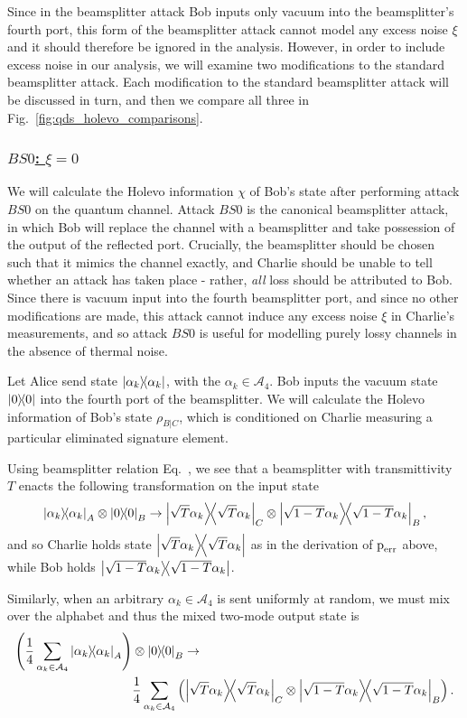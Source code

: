 Since in the beamsplitter attack Bob inputs only vacuum into the beamsplitter's fourth port, this form of the beamsplitter attack cannot model any excess noise $\xi$ and it should therefore be ignored in the analysis. However, in order to include excess noise in our analysis, we will examine two modifications to the standard beamsplitter attack. Each modification to the standard beamsplitter attack will be discussed in turn, and then we compare all three in Fig.~\ref{fig:qds_holevo_comparisons}. 

\subsubsection{\underline{$BS0$: $\xi = 0$}}
We will calculate the Holevo information $\chi$ of Bob's state after performing attack $BS0$ on the quantum channel. Attack $BS0$ is the canonical beamsplitter attack, in which Bob will replace the channel with a beamsplitter and take possession of the output of the reflected port. Crucially, the beamsplitter should be chosen such that it mimics the channel exactly, and Charlie should be unable to tell whether an attack has taken place - rather, \emph{all} loss should be attributed to Bob. Since there is vacuum input into the fourth beamsplitter port, and since no other modifications are made, this attack cannot induce any excess noise $\xi$ in Charlie's measurements, and so attack $BS0$ is useful for modelling purely lossy channels in the absence of thermal noise.

Let Alice send state $\dyad{\alpha_k}$, with the $\alpha_k \in \mathcal{A}_4$. Bob inputs the vacuum state $\dyad{0}$ into the fourth port of the beamsplitter. We will calculate the Holevo information of Bob's state $\rho_{B | C}$, which is conditioned on Charlie measuring a particular eliminated signature element.

Using beamsplitter relation Eq.~, we see that a beamsplitter with transmittivity $T$ enacts the following transformation on the input state
\begin{equation}
\dyad{\alpha_k}_A \otimes \dyad{0}_B \rightarrow \dyad{\sqrt{T} \alpha_k}_C \otimes \dyad{\sqrt{1-T}\alpha_k}_{B},
\end{equation}
and so Charlie holds state $\dyad{\sqrt{T}\alpha_k}$ as in the derivation of $\text{p}_{\text{err}}$ above, while Bob holds $\dyad{\sqrt{1-T}\alpha_k}$.

Similarly, when an arbitrary $\alpha_k \in \mathcal{A}_4$ is sent uniformly at random, we must mix over the alphabet and thus the mixed two-mode output state is
\begin{align}
\left(\frac{1}{4}\sum_{\alpha_k \in \mathcal{A}_4} \dyad{\alpha_k}_A\right) &\otimes \dyad{0}_B \rightarrow \notag \\
&\frac{1}{4}\sum_{\alpha_k \in \mathcal{A}_4} \left(\dyad{\sqrt{T}\alpha_k}_C \otimes \dyad{\sqrt{1-T}\alpha_k}_B\right).
\end{align}


